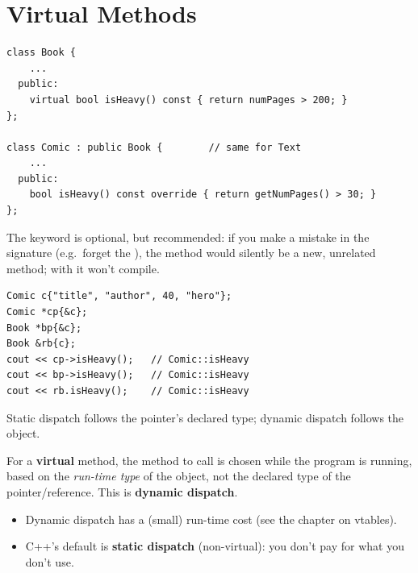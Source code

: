 \section{Virtual Methods}
\begin{lstlisting}[style=cpp]
class Book {
    ...
  public:
    virtual bool isHeavy() const { return numPages > 200; }
};

class Comic : public Book {        // same for Text
    ...
  public:
    bool isHeavy() const override { return getNumPages() > 30; }
};
\end{lstlisting}
The keyword  is optional, but recommended: if you make a mistake
in the signature (e.g.\ forget the ), the method would silently be a
new, unrelated method; with  it won't compile.

\begin{lstlisting}[style=cpp]
Comic c{"title", "author", 40, "hero"};
Comic *cp{&c};
Book *bp{&c};
Book &rb{c};
cout << cp->isHeavy();   // Comic::isHeavy
cout << bp->isHeavy();   // Comic::isHeavy
cout << rb.isHeavy();    // Comic::isHeavy
\end{lstlisting}
\begin{center}

\small Static dispatch follows the pointer's declared type; dynamic dispatch follows the object.
\end{center}

\begin{definition}
For a \textbf{virtual} method, the method to call is chosen while the program
is running, based on the \emph{run-time type} of the object, not the declared
type of the pointer/reference. This is \textbf{dynamic dispatch}.
\end{definition}
\begin{itemize}
  \item Dynamic dispatch has a (small) run-time cost (see the chapter on
        vtables).
  \item C++'s default is \textbf{static dispatch} (non-virtual): you don't pay
        for what you don't use.
\end{itemize}

